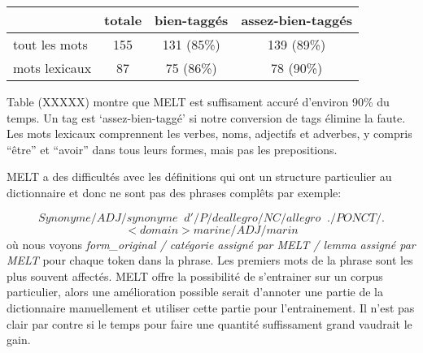 \begin{center}
\begin{tabular}{|l|c|c|c|}
\hline
              & totale & bien-taggés & assez-bien-taggés  \\
\hline
tout les mots & 155    & 131 (85\%)  & 139 (89\%)         \\
\hline
mots lexicaux & 87     & 75  (86\%)  & 78  (90\%)         \\
\hline
\end{tabular}
\end{center}

Table (XXXXX) montre que MELT est suffisament accuré d'environ 90\%
du temps. Un tag est `assez-bien-taggé' si notre conversion de tags
élimine la faute. Les mots lexicaux comprennent les verbes, noms,
adjectifs et adverbes, y compris ``être'' et ``avoir''
dans tous leurs formes, mais pas les prepositions.

MELT a des difficultés avec les définitions qui ont un structure
particulier au dictionnaire et donc ne sont pas des phrases complêts
par exemple:

$$Synonyme/ADJ/synonyme \;\; d'/P/de allegro/NC/allegro \;\; ./PONCT/.$$
$$<domain>marine/ADJ/marin$$
où nous voyons
\emph{form\_original / catégorie assigné par MELT / lemma assigné par MELT}
pour
chaque token dans la phrase. Les premiers mots de la phrase sont les
plus souvent affectés. MELT offre la possibilité de s'entrainer sur
un corpus particulier, alors une amélioration possible serait d'annoter
une partie de la dictionnaire manuellement et utiliser cette partie
pour l'entrainement. Il n'est pas clair par contre si le temps pour
faire une quantité suffissament grand vaudrait le gain.
